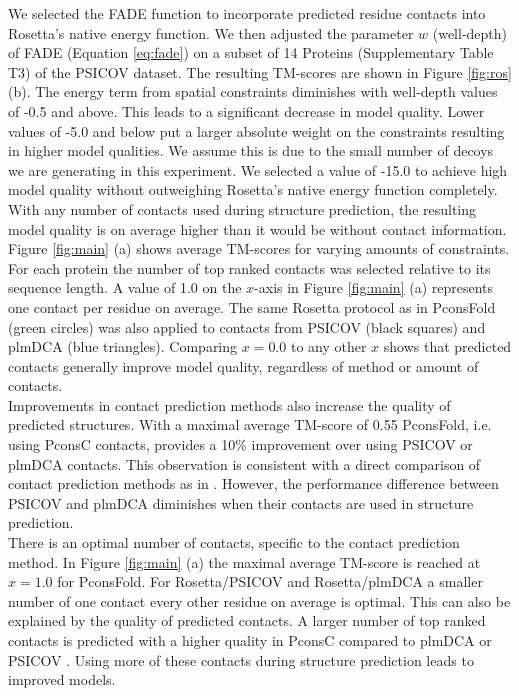 \documentclass{bioinfo}
\begin{document}
We selected the FADE function to incorporate predicted residue contacts into Rosetta's native energy function. We then adjusted the parameter $w$ (well-depth) of FADE (Equation \ref{eq:fade}) on a subset of 14 Proteins (Supplementary Table T3) of the PSICOV dataset. The resulting TM-scores are shown in Figure \ref{fig:ros} (b). The energy term from spatial constraints diminishes with well-depth values of -0.5 and above. This leads to a significant decrease in model quality. Lower values of -5.0 and below put a larger absolute weight on the constraints resulting in higher model qualities. We assume this is due to the small number of decoys we are generating in this experiment. We selected a value of -15.0 to achieve high model quality without outweighing Rosetta's native energy function completely.\\\indent
With any number of contacts used during structure prediction, the resulting model quality is on average higher than it would be without contact information. Figure \ref{fig:main} (a) shows average TM-scores for varying amounts of constraints. For each protein the number of top ranked contacts was selected relative to its sequence length. A value of 1.0 on the $x$-axis in Figure \ref{fig:main} (a) represents one contact per residue on average. The same Rosetta protocol as in PconsFold (green circles) was also applied to contacts from PSICOV (black squares) and plmDCA (blue triangles). Comparing $x=0.0$ to any other $x$ shows that predicted contacts generally improve model quality, regardless of method or amount of contacts. \\\indent
Improvements in contact prediction methods also increase the quality of predicted structures. With a maximal average TM-score of 0.55 PconsFold, i.e. using PconsC contacts, provides a 10\% improvement over using PSICOV or plmDCA contacts. This observation is consistent with a direct comparison of contact prediction methods as in \citeauthor{skwark_PconsC:_2013} \citeyear{skwark_PconsC:_2013}. However, the performance difference between PSICOV and plmDCA diminishes when their contacts are used in structure prediction. \\\indent
There is an optimal number of contacts, specific to the contact prediction method. In Figure \ref{fig:main} (a) the maximal average TM-score is reached at $x=1.0$ for PconsFold. For Rosetta/PSICOV and Rosetta/plmDCA a smaller number of one contact every other residue on average is optimal. This can also be explained by the quality of predicted contacts. A larger number of top ranked contacts is predicted with a higher quality in PconsC compared to plmDCA or PSICOV \cite[]{skwark_PconsC:_2013}. Using more of these contacts during structure prediction leads to improved models. \\\indent
\end{document}
